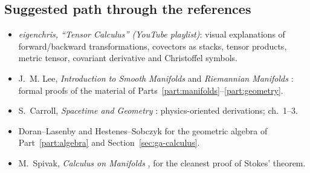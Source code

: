 \subsection{Suggested path through the references}
\begin{itemize}
\item \emph{eigenchris, ``Tensor Calculus'' (YouTube playlist)}: visual explanations of forward/backward transformations, covectors as stacks, tensor products, metric tensor, covariant derivative and Christoffel symbols.
\item J.~M. Lee, \emph{Introduction to Smooth Manifolds} and \emph{Riemannian Manifolds} \cite{Lee}: formal proofs of the material of Parts~\ref{part:manifolds}--\ref{part:geometry}.
\item S.~Carroll, \emph{Spacetime and Geometry} \cite{Carroll}: physics-oriented derivations; ch.~1--3.
\item Doran--Lasenby \cite{DL} and Hestenes--Sobczyk \cite{HS} for the geometric algebra of Part~\ref{part:algebra} and Section~\ref{sec:ga-calculus}.
\item M.~Spivak, \emph{Calculus on Manifolds} \cite{Spivak}, for the cleanest proof of Stokes' theorem.
\end{itemize}
